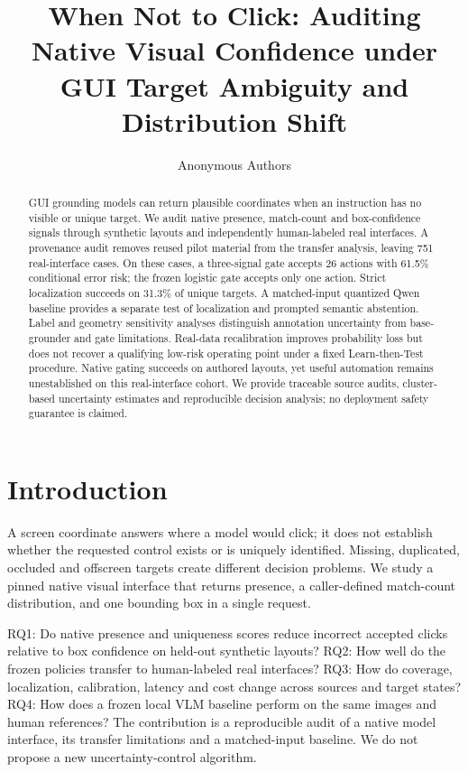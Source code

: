 \documentclass[10pt]{article}
\title{When Not to Click: Auditing Native Visual Confidence under GUI Target Ambiguity and Distribution Shift}
\author{Anonymous Authors}
\date{}
\begin{document}
\maketitle
\begin{abstract}
GUI grounding models can return plausible coordinates when an instruction has no visible or unique target. We audit native presence, match-count and box-confidence signals through synthetic layouts and independently human-labeled real interfaces. A provenance audit removes reused pilot material from the transfer analysis, leaving 751 real-interface cases. On these cases, a three-signal gate accepts 26 actions with 61.5\% conditional error risk; the frozen logistic gate accepts only one action. Strict localization succeeds on 31.3\% of unique targets. A matched-input quantized Qwen baseline provides a separate test of localization and prompted semantic abstention. Label and geometry sensitivity analyses distinguish annotation uncertainty from base-grounder and gate limitations. Real-data recalibration improves probability loss but does not recover a qualifying low-risk operating point under a fixed Learn-then-Test procedure. Native gating succeeds on authored layouts, yet useful automation remains unestablished on this real-interface cohort. We provide traceable source audits, cluster-based uncertainty estimates and reproducible decision analysis; no deployment safety guarantee is claimed.
\end{abstract}
\section{Introduction}
A screen coordinate answers where a model would click; it does not establish whether the requested control exists or is uniquely identified. Missing, duplicated, occluded and offscreen targets create different decision problems. We study a pinned native visual interface that returns presence, a caller-defined match-count distribution, and one bounding box in a single request.

RQ1: Do native presence and uniqueness scores reduce incorrect accepted clicks relative to box confidence on held-out synthetic layouts? RQ2: How well do the frozen policies transfer to human-labeled real interfaces? RQ3: How do coverage, localization, calibration, latency and cost change across sources and target states? RQ4: How does a frozen local VLM baseline perform on the same images and human references? The contribution is a reproducible audit of a native model interface, its transfer limitations and a matched-input baseline. We do not propose a new uncertainty-control algorithm.
\end{document}

